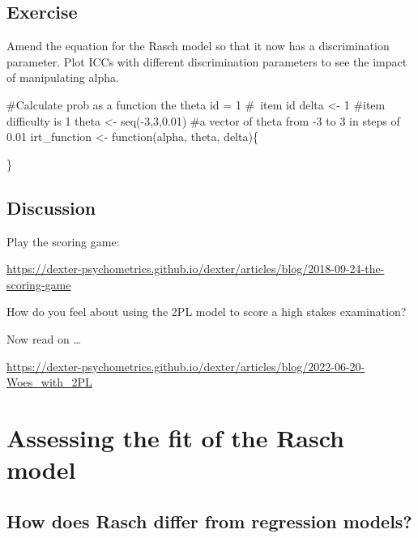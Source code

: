 \documentclass[
  letterpaper,
  DIV=11,
  numbers=noendperiod]{scrreprt}
\newenvironment{Shaded}{\begin{snugshade}}{\end{snugshade}}
\newcommand{\CommentTok}[1]{\textcolor[rgb]{0.37,0.37,0.37}{#1}}
\newcommand{\ControlFlowTok}[1]{\textcolor[rgb]{0.00,0.23,0.31}{#1}}
\newcommand{\DecValTok}[1]{\textcolor[rgb]{0.68,0.00,0.00}{#1}}
\newcommand{\FloatTok}[1]{\textcolor[rgb]{0.68,0.00,0.00}{#1}}
\newcommand{\FunctionTok}[1]{\textcolor[rgb]{0.28,0.35,0.67}{#1}}
\newcommand{\NormalTok}[1]{\textcolor[rgb]{0.00,0.23,0.31}{#1}}
\newcommand{\OtherTok}[1]{\textcolor[rgb]{0.00,0.23,0.31}{#1}}
\newcommand{\SpecialCharTok}[1]{\textcolor[rgb]{0.37,0.37,0.37}{#1}}
\begin{document}
\hypertarget{exercise-1}{%
\section{Exercise}\label{exercise-1}}

Amend the equation for the Rasch model so that it now has a
discrimination parameter. Plot ICCs with different discrimination
parameters to see the impact of manipulating alpha.

\begin{Shaded}
\begin{Highlighting}[]
\CommentTok{\#Calculate prob as a function the theta}
\NormalTok{id }\OtherTok{=} \DecValTok{1} \CommentTok{\# item id}
\NormalTok{delta }\OtherTok{\textless{}{-}} \DecValTok{1} \CommentTok{\#item difficulty is 1}
\NormalTok{theta }\OtherTok{\textless{}{-}} \FunctionTok{seq}\NormalTok{(}\SpecialCharTok{{-}}\DecValTok{3}\NormalTok{,}\DecValTok{3}\NormalTok{,}\FloatTok{0.01}\NormalTok{) }\CommentTok{\#a vector of theta from {-}3 to 3 in steps of 0.01}
\NormalTok{irt\_function }\OtherTok{\textless{}{-}} \ControlFlowTok{function}\NormalTok{(alpha, theta, delta)\{}
    
\NormalTok{\}}
\end{Highlighting}
\end{Shaded}

\hypertarget{discussion-1}{%
\section{Discussion}\label{discussion-1}}

Play the scoring game:

\url{https://dexter-psychometrics.github.io/dexter/articles/blog/2018-09-24-the-scoring-game}

How do you feel about using the 2PL model to score a high stakes
examination?

Now read on \ldots{}

\url{https://dexter-psychometrics.github.io/dexter/articles/blog/2022-06-20-Woes_with_2PL}

\hypertarget{assessing-the-fit-of-the-rasch-model}{%
\chapter{Assessing the fit of the Rasch
model}\label{assessing-the-fit-of-the-rasch-model}}

\hypertarget{how-does-rasch-differ-from-regression-models}{%
\section{How does Rasch differ from regression
models?}\label{how-does-rasch-differ-from-regression-models}}
\end{document}
